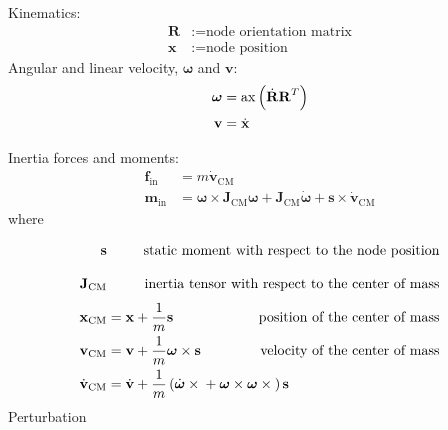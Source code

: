\documentclass[10pt,dvips,fleqn,subeqn]{report}
\newcommand{\T}[1]{\bm{\mathbf{#1}}}
\newcommand{\TT}[1]{\bm{\mathbf{#1}}}
\begin{document}
Kinematics:
\begin{subequations}
\begin{align}
	\TT{R} &:= \text{node orientation matrix} \\
	\T{x} &:= \text{node position}
\end{align}
\end{subequations}
Angular and linear velocity, $\T{\omega}$ and $\T{v}$:
\begin{subequations}
\begin{align}
	\T{\omega} &= \mathrm{ax}\plbr{\dot{\TT{R}} \TT{R}^T} \\
	\T{v} &= \dot{\T{x}}
\end{align}
\end{subequations}

Inertia forces and moments:
\begin{subequations}
\begin{align}
	\T{f}_{\text{in}} &= m \dot{\T{v}}_{\text{CM}} \\
	\T{m}_{\text{in}} &=
	\T{\omega} \times \TT{J}_{\text{CM}} \T{\omega}
	+ \TT{J}_{\text{CM}} \dot{\T{\omega}}
	+ \T{s} \times \dot{\T{v}}_{\text{CM}}
\end{align}
\end{subequations}
where
\begin{subequations}
\begin{align}
	\T{s} & \vphantom{\frac{1}{m}}
		&\hspace{-40mm} \text{static moment with respect to the node position} \\
	\TT{J}_{\text{CM}} & \vphantom{\frac{1}{m}}
		&\hspace{-40mm} \text{inertia tensor with respect to the center of mass} \\
	\T{x}_{\text{CM}} &= \T{x} + \frac{1}{m} \T{s}
		&\hspace{-40mm} \text{position of the center of mass} \\
	\T{v}_{\text{CM}} &= \T{v} + \frac{1}{m} \T{\omega} \times \T{s}
		&\hspace{-40mm} \text{velocity of the center of mass} \\
	\dot{\T{v}}_{\text{CM}} &= \dot{\T{v}}
		+ \frac{1}{m}\plbr{
			\dot{\T{\omega}}\times{}
			+ \T{\omega}\times\T{\omega}\times{}
		} \T{s}
\end{align}
\end{subequations}
Perturbation
\end{document}
